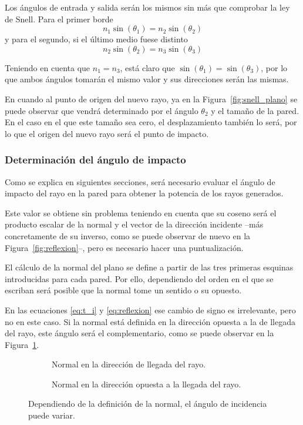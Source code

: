 Los ángulos de entrada y salida serán los mismos sin más que comprobar la ley de Snell.\cite{Graficos}
Para el primer borde
\begin{equation}
    n_1\sin(\theta_1) = n_2\sin(\theta_2)
\end{equation}
y para el segundo, si el último medio fuese distinto
\begin{equation}
    n_2\sin(\theta_2) = n_3\sin(\theta_3)
\end{equation}

Teniendo en cuenta que $n_1=n_3$, está claro que $\sin(\theta_1)=\sin(\theta_3)$, por lo que ambos ángulos tomarán el mismo valor y sus direcciones serán las mismas.

En cuando al punto de origen del nuevo rayo, ya en la Figura~\ref{fig:snell_plano} se puede observar que vendrá determinado por el ángulo $\theta_2$ y el tamaño de la pared.
En el caso en el que este tamaño sea cero, el desplazamiento también lo será, por lo que el origen del nuevo rayo será el punto de impacto.

\subsubsection*{Determinación del ángulo de impacto}

Como se explica en siguientes secciones, será necesario evaluar el ángulo de impacto del rayo en la pared para obtener la potencia de los rayos generados.

Este valor se obtiene sin problema teniendo en cuenta que su coseno será el producto escalar de la normal y el vector de la dirección incidente --más concretamente de su inverso, como se puede observar de nuevo en la Figura~\ref{fig:reflexion}--, pero es necesario hacer una puntualización.

El cálculo de la normal del plano se define a partir de las tres primeras esquinas introducidas para cada pared.
Por ello, dependiendo del orden en el que se escriban será posible que la normal tome un sentido o su opuesto.

En las ecuaciones \eqref{eq:t_i} y \eqref{eq:reflexion} ese cambio de signo es irrelevante, pero no en este caso.
Si la normal está definida en la dirección opuesta a la de llegada del rayo, este ángulo será el complementario, como se puede observar en la Figura~\ref{fig:angulo_incidencia}.
\begin{figure}[H]
    \centering
    \begin{subfigure}[b]{0.4\textwidth}
        \centering
        
        \caption{Normal en la dirección de llegada del rayo.}
    \end{subfigure}
    \hspace*{10pt}
    \begin{subfigure}[b]{0.4\textwidth}
        \centering
        
        \caption{Normal en la dirección opuesta a la llegada del rayo.}
    \end{subfigure}
    \caption{Dependiendo de la definición de la normal, el ángulo de incidencia puede variar.}
    \label{fig:angulo_incidencia}
\end{figure}

